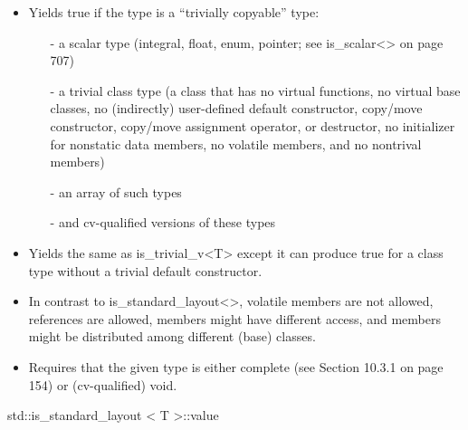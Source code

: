 \begin{itemize}
\item 
Yields true if the type is a “trivially copyable” type:

\begin{itemize}
\item [-]
a scalar type (integral, float, enum, pointer; see is\_scalar<> on page 707)

\item [-]
a trivial class type (a class that has no virtual functions, no virtual base classes, no (indirectly) user-defined default constructor, copy/move constructor, copy/move assignment operator, or destructor, no initializer for nonstatic data members, no volatile members, and no nontrival members)

\item [-]
an array of such types

\item [-]
and cv-qualified versions of these types
\end{itemize}

\item 
Yields the same as is\_trivial\_v<T> except it can produce true for a class type without a trivial default constructor.

\item 
In contrast to is\_standard\_layout<>, volatile members are not allowed, references are allowed, members might have different access, and members might be distributed among different (base) classes.

\item 
Requires that the given type is either complete (see Section 10.3.1 on page 154) or (cv-qualified) void.
\end{itemize}

std::is\_standard\_layout < T >::value

